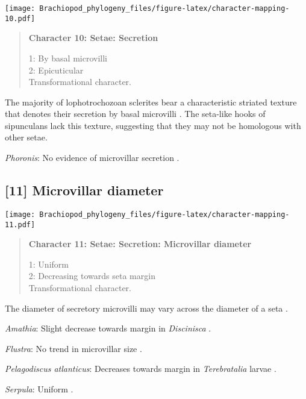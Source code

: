 \documentclass[openany]{book}
\theoremstyle{definition}
\theoremstyle{definition}
\theoremstyle{definition}
\theoremstyle{remark}
\begin{document}
\texttt{[image: Brachiopod\_phylogeny\_files/figure-latex/character-mapping-10.pdf]}

\begin{quote}
\textbf{Character 10: Setae: Secretion}

1: By basal microvilli\\
2: Epicuticular\\
Transformational character.
\end{quote}

The majority of lophotrochozoan sclerites bear a characteristic striated
texture that denotes their secretion by basal microvilli
\citep{Butterfield1990}. The seta-like hooks of sipunculans lack this
texture, suggesting that they may not be homologous with other setae.

\hypertarget{Phoronis-coding-10}{}
\emph{Phoronis}: No evidence of microvillar secretion
\citep[e.g.][]{Schulze2005}.

\subsection*{{[}11{]} Microvillar diameter}\label{microvillar-diameter}

\texttt{[image: Brachiopod\_phylogeny\_files/figure-latex/character-mapping-11.pdf]}

\begin{quote}
\textbf{Character 11: Setae: Secretion: Microvillar diameter}

1: Uniform\\
2: Decreasing towards seta margin\\
Transformational character.
\end{quote}

The diameter of secretory microvilli may vary across the diameter of a
seta \citep{Smith2014}.

\hypertarget{Amathia-coding-11}{}
\emph{Amathia}: Slight decrease towards margin in \emph{Discinisca}
\citep{Luter2003}.

\hypertarget{Flustra-coding-11}{}
\emph{Flustra}: No trend in microvillar size \citep{Gordon1975}.

\hypertarget{Pelagodiscus_atlanticus-coding-11}{}
\emph{Pelagodiscus atlanticus}: Decreases towards margin in
\emph{Terebratalia} larvae \citep{Gustus1972}.

\hypertarget{Serpula-coding-11}{}
\emph{Serpula}: Uniform \citep{Fischer1980, Leise1982}.
\end{document}

